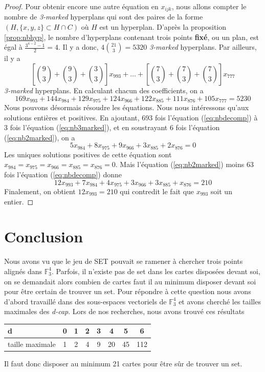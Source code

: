 \documentclass[a4paper,12pt,titlepage]{article}
\theoremstyle{plain}
\theoremstyle{definition}
\newcommand{\Ftrois}[1]{\mathbb{F}^#1_3}
\begin{document}
\begin{proof}
Pour obtenir encore une autre équation en $x_{ijk}$, nous allons compter le nombre de \emph{3-marked} hyperplans qui sont des paires de la forme $(H,\{x,y,z\} \subset H \cap C)$ où $H$ est un hyperplan. D'après la proposition \ref{prop:nbhyp}, le nombre d'hyperplans contenant trois points \textbf{fixé}, ou un plan, est égal à $\frac{3^{4-2}-1}{2} = 4$. Il y a donc, $4 \binom{21}{3} = 5320$ \emph{3-marked} hyperplans. Par ailleurs, il y a 
\[
\left[\binom{9}{3}+\binom{9}{3}+\binom{3}{3}\right]x_{993} + \dots + \left[\binom{7}{3}+\binom{7}{3}+\binom{7}{3}\right]x_{777}
\]
\emph{3-marked} hyperplans. En calculant chacun des coefficients, on a
\begin{equation} \label{eq:nb3marked}
169x_{993} + 144x_{984} + 129x_{975} + 124x_{966} + 122x_{885} + 111x_{876} + 105x_{777} = 5230
\end{equation}
Nous pouvons désormais résoudre les équations. Nous nous intéressons qu'aux solutions entières et positives. En ajoutant, 693 fois l'équation (\ref{eq:nbdecomp}) à 3 fois l'équation (\ref{eq:nb3marked}), et en soustrayant 6 fois l'équation (\ref{eq:nb2marked}), on a
\[
5x_{984} + 8x_{975} + 9x_{966} + 3x_{885} + 2x_{876} = 0
\]
Les uniques solutions positives de cette équation sont $x_{984} = x_{975} = x_{966} = x_{885} = x_{876} = 0$. Mais l'équation (\ref{eq:nb2marked}) moins 63 fois l'équation (\ref{eq:nbdecomp}) donne
\[
12x_{993} + 7x_{984} + 4x_{975} + 3x_{966} + 3x_{885} + x_{876} = 210
\]
Finalement, on obtient $12x_{993} = 210$ qui contredit le fait que $x_{993}$ soit un entier.
\end{proof}

\section{Conclusion}
Nous avons vu que le jeu de SET pouvait se ramener à chercher trois points alignés dans $\Ftrois{4}$.
Parfois, il n'existe pas de set dans les cartes disposées devant soi, on se demandait alors combien de cartes faut il au minimum disposer devant soi pour être certain de trouver un set.
Pour répondre à cette question nous avons d'abord travaillé dans des sous-espaces vectoriels de $\Ftrois{4}$
et avons cherché les tailles maximales des \emph{d-cap}. Lors de nos recherches, nous avons trouvé ces résultats

\begin{center}
\begin{tabular}{ l | *{7}{c} }
d & 0 & 1 & 2 & 3 & 4 & 5 & 6\\
\hline
taille maximale & 1 & 2 & 4 & 9 & 20 & 45 & 112 \\
\end{tabular}
\end{center}

Il faut donc disposer au minimum 21 cartes pour être sûr de trouver un set.



\nocite{*}
\end{document}
